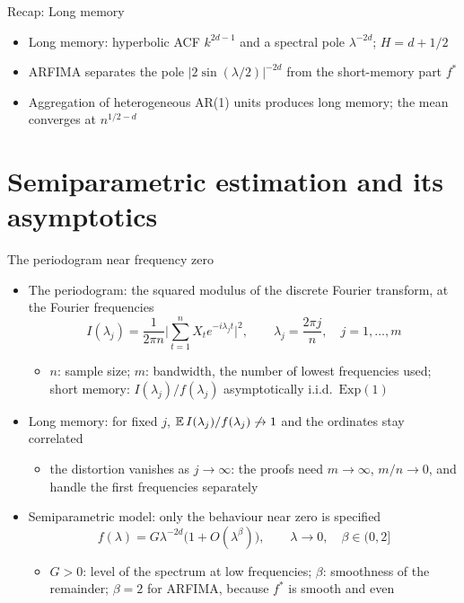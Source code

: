\begin{frame}{Recap: Long memory}
\itemsize{\small}
\begin{itemize}
    \item Long memory: hyperbolic ACF $k^{2d-1}$ and a spectral pole $\lambda^{-2d}$; $H = d + 1/2$
    \item ARFIMA separates the pole $|2\sin(\lambda/2)|^{-2d}$ from the short-memory part $f^*$
    \item Aggregation of heterogeneous AR(1) units produces long memory; the mean converges at $n^{1/2-d}$
\end{itemize}
\end{frame}


\section{Semiparametric estimation and its asymptotics}

\begin{frame}{The periodogram near frequency zero}
\itemsize{\small}
\begin{itemize}
    \item The periodogram: the squared modulus of the discrete Fourier transform, at the Fourier frequencies
    \[ I(\lambda_j) = \frac{1}{2\pi n}\Big|\sum_{t=1}^n X_te^{-i\lambda_jt}\Big|^2, \qquad \lambda_j = \frac{2\pi j}{n}, \quad j = 1, \dots, m \]
    \begin{itemize}
        \item $n$: sample size; $m$: bandwidth, the number of lowest frequencies used; short memory: $I(\lambda_j)/f(\lambda_j)$ asymptotically i.i.d.\ $\mathrm{Exp}(1)$
    \end{itemize}
    \item Long memory: for fixed $j$, $\mathbb{E}\,I(\lambda_j)/f(\lambda_j) \not\to 1$ and the ordinates stay correlated 
    \begin{itemize}
        \item the distortion vanishes as $j \to \infty$: the proofs need $m \to \infty$, $m/n \to 0$, and handle the first frequencies separately
    \end{itemize}
    \item Semiparametric model: only the behaviour near zero is specified
    \[ f(\lambda) = G\lambda^{-2d}\big(1 + O(\lambda^\beta)\big), \qquad \lambda \to 0, \quad \beta \in (0, 2] \]
    \begin{itemize}
        \item $G > 0$: level of the spectrum at low frequencies; $\beta$: smoothness of the remainder; $\beta = 2$ for ARFIMA, because $f^*$ is smooth and even
    \end{itemize}
\end{itemize}
\end{frame}

